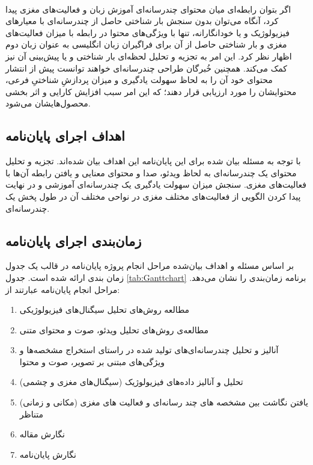 \\
اگر بتوان رابطه‌ای میان محتوای‌ چندرسانه‌ای آموزش زبان و فعالیت‌های مغزی پیدا کرد، آنگاه می‌توان بدون سنجش بار شناختی حاصل از چندرسانه‌ای با معیار‌های فیزیولوژیک و یا خودانگارانه، تنها با ویژگی‌های محتوا در رابطه با میزان فعالیت‌های مغزی و بار شناختی حاصل از آن برای فراگیران زبان انگلیسی به عنوان زبان دوم اظهار نظر کرد. این امر به تجزیه و تحلیل لحظه‌ای بار شناختی و یا پیش‌بینی آن نیز کمک می‌کند. همچنین خُبرگان طراحی چندرسانه‌ای خواهند توانست پیش از انتشار محتوای خود آن را به لحاظ سهولت یادگیری و میزان پردازشِ شناختیِ فرعی، محتوایشان را مورد ارزیابی قرار دهند؛ که این امر سبب افزایش کارایی و اثر بخشی محصول‌هایشان می‌شود.
\subsection{اهداف اجرای پایان‌نامه}
با توجه به مسئله  بیان شده برای این پایان‌نامه این اهداف بیان شده‌اند. تجزیه و تحلیل محتوای یک چندرسانه‌ای به لحاظ ویدئو، صدا و محتوای معنایی و یافتن رابطه آن‌ها با فعالیت‌های مغزی. سنجش میزان سهولت یادگیری یک چندرسانه‌ای آموزشی و در نهایت پیدا کردن الگویی از فعالیت‌های مختلف مغزی در نواحی مختلف‌ آن در طول پخش یک چندرسانه‌ای.
\subsection{زمان‌بندی اجرای پایان‌نامه}
بر اساس مسئله و اهداف بیان‌شده مراحل انجام پروژه پایان‌نامه در قالب یک جدول زمان بندی ارائه شده است. جدول 
\ref{tab:Ganttchart}
برنامه زمان‌بندی را نشان می‌دهد. مراحل انجام پایان‌نامه عبارتند از:
\begin{enumerate}
	\item مطالعه روش‌های تحلیل سیگنال‌های فیزیولوژیکی
	\item مطالعه‌ی روش‌های تحلیل ویدئو، صوت و محتوای متنی
	\item آنالیز و تحلیل چندرسانه‌ای‌های تولید شده در راستای استخراج مشخصه‌ها و ویژگی‌های مبتنی بر تصویر، صوت و محتوا
	\item تحلیل و آنالیز داده‌های فیزیولوژیک (سیگنال‌های مغزی و چشمی)
	\item یافتن نگاشت بین مشخصه های چند رسانه‌ای و فعالیت های مغزی (مکانی و زمانی) متناظر
	\item نگارش مقاله
	\item نگارش پایان‌نامه
\end{enumerate}


